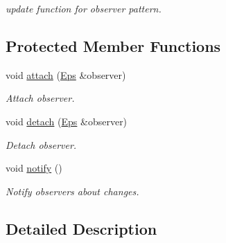 \begin{DoxyCompactItemize}
\begin{DoxyCompactList}\small\item\em update function for observer pattern. \end{DoxyCompactList}\end{DoxyCompactItemize}
\subsection*{Protected Member Functions}
\begin{DoxyCompactItemize}
\item 
\hypertarget{classSpacy_1_1Mixin_1_1MixinConnection_abb5520ee6b22dd993d78f142939a1ed4}{}void \hyperlink{classSpacy_1_1Mixin_1_1MixinConnection_abb5520ee6b22dd993d78f142939a1ed4}{attach} (\hyperlink{classSpacy_1_1Mixin_1_1Eps_a51dbe0b9cc950e0f3dfd34a481f08ae4_a51dbe0b9cc950e0f3dfd34a481f08ae4}{Eps} \&observer)\label{classSpacy_1_1Mixin_1_1MixinConnection_abb5520ee6b22dd993d78f142939a1ed4}

\begin{DoxyCompactList}\small\item\em Attach observer. \end{DoxyCompactList}\item 
\hypertarget{classSpacy_1_1Mixin_1_1MixinConnection_adda739590c487679c26f60e50aedb73f}{}void \hyperlink{classSpacy_1_1Mixin_1_1MixinConnection_adda739590c487679c26f60e50aedb73f}{detach} (\hyperlink{classSpacy_1_1Mixin_1_1Eps_a51dbe0b9cc950e0f3dfd34a481f08ae4_a51dbe0b9cc950e0f3dfd34a481f08ae4}{Eps} \&observer)\label{classSpacy_1_1Mixin_1_1MixinConnection_adda739590c487679c26f60e50aedb73f}

\begin{DoxyCompactList}\small\item\em Detach observer. \end{DoxyCompactList}\item 
\hypertarget{classSpacy_1_1Mixin_1_1MixinConnection_a1ddeaa78a3bb4a38c2cca36d1f99fe36}{}void \hyperlink{classSpacy_1_1Mixin_1_1MixinConnection_a1ddeaa78a3bb4a38c2cca36d1f99fe36}{notify} ()\label{classSpacy_1_1Mixin_1_1MixinConnection_a1ddeaa78a3bb4a38c2cca36d1f99fe36}

\begin{DoxyCompactList}\small\item\em Notify observers about changes. \end{DoxyCompactList}\end{DoxyCompactItemize}


\subsection{Detailed Description}
